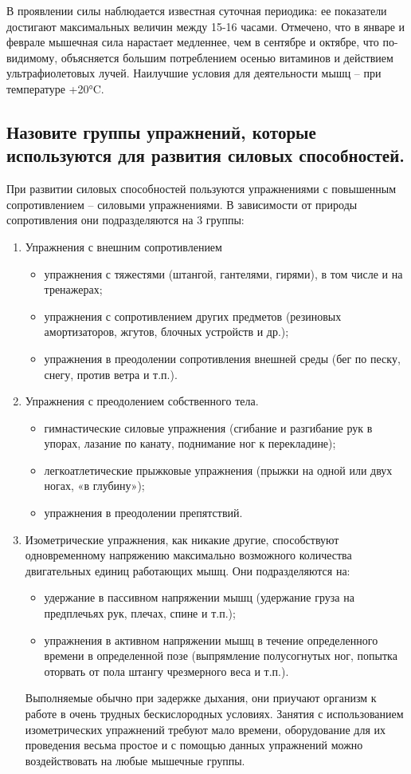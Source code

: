 В проявлении силы наблюдается известная суточная периодика: ее показатели достигают максимальных величин между 15-16 часами. Отмечено, что в январе и феврале мышечная сила нарастает медленнее, чем в сентябре и октябре, что по-видимому, объясняется большим потреблением осенью витаминов и действием ультрафиолетовых лучей. Наилучшие условия для деятельности мышц – при температуре +20°C.


\subsection{Назовите группы упражнений, которые используются для развития силовых способностей.}

При развитии силовых способностей пользуются упражнениями с повышенным сопротивлением – силовыми упражнениями. В зависимости от природы сопротивления они подразделяются на 3 группы:
\begin{enumerate}
    \item Упражнения с внешним сопротивлением
    \begin{itemize}
        \item упражнения с тяжестями (штангой, гантелями, гирями), в том числе и на тренажерах;
        \item упражнения с сопротивлением других предметов (резиновых амортизаторов, жгутов, блочных устройств и др.);
        \item упражнения в преодолении сопротивления внешней среды (бег по песку, снегу, против ветра и т.п.).
    \end{itemize}
    \item Упражнения с преодолением собственного тела.
    \begin{itemize}
        \item гимнастические силовые упражнения (сгибание и разгибание рук в упорах, лазание по канату, поднимание ног к перекладине);
        \item легкоатлетические прыжковые упражнения (прыжки на одной или двух ногах, «в глубину»);
        \item упражнения в преодолении препятствий.
    \end{itemize}
    \item Изометрические упражнения, как никакие другие, способствуют одновременному напряжению максимально возможного количества двигательных единиц работающих мышц. Они подразделяются на:
    \begin{itemize}
        \item удержание в пассивном напряжении мышц (удержание груза на предплечьях рук, плечах, спине и т.п.);
        \item упражнения в активном напряжении мышц в течение определенного времени в определенной позе (выпрямление полусогнутых ног, попытка оторвать от пола штангу чрезмерного веса и т.п.).
    \end{itemize}
    Выполняемые обычно при задержке дыхания, они приучают организм к работе в очень трудных бескислородных условиях. Занятия с использованием изометрических упражнений требуют мало времени, оборудование для их проведения весьма простое и с помощью данных упражнений можно воздействовать на любые мышечные группы.
\end{enumerate}


